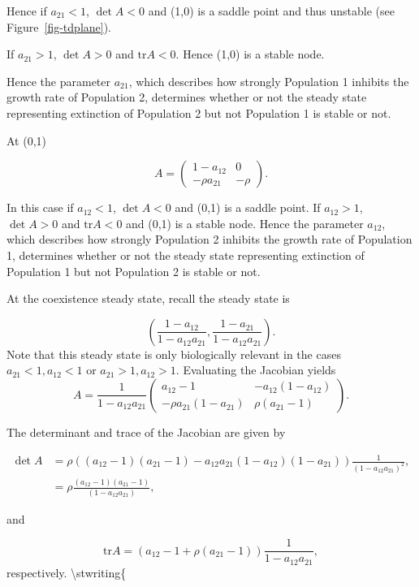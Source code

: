 \documentclass[
  letterpaper,
  DIV=11,
  numbers=noendperiod]{scrreprt}
\begin{document}
Hence if \(a_{21}<1\), \(\det{A}<0\) and (1,0) is a saddle point and
thus unstable (see Figure~\ref{fig-tdplane}).

If \(a_{21}>1\), \(\det{A}>0\) and \(\mathrm{tr}{A}<0\). Hence (1,0) is
a stable node.

Hence the parameter \(a_{21}\), which describes how strongly Population
1 inhibits the growth rate of Population 2, determines whether or not
the steady state representing extinction of Population 2 but not
Population 1 is stable or not.

At (0,1)

\[
A=\left(\begin{array}{rr}
1-a_{12}& 0\\  -\rho a_{21} & -\rho \end{array}\right). 
\]

In this case if \(a_{12}<1\), \(\det{A}<0\) and (0,1) is a saddle point.
If \(a_{12}>1\), \(\det{A}>0\) and \(\mathrm{tr}{A}<0\) and (0,1) is a
stable node. Hence the parameter \(a_{12}\), which describes how
strongly Population 2 inhibits the growth rate of Population 1,
determines whether or not the steady state representing extinction of
Population 1 but not Population 2 is stable or not.

At the coexistence steady state, recall the steady state is

\[
\left(\frac{1-a_{12}}{1-a_{12}a_{21}},\frac{1-a_{21}}{1-a_{12}a_{21}}\right).
\] Note that this steady state is only biologically relevant in the
cases \(a_{21}<1, a_{12}<1\) or \(a_{21}>1, a_{12}>1\). Evaluating the
Jacobian yields \[
A=\frac{1}{1-a_{12}a_{21}}\left(\begin{array}{rr}
a_{12}-1  & -a_{12}(1-a_{12})\\ -\rho a_{21}(1-a_{21}) &\rho(a_{21}-1)\end{array}\right). 
\]

The determinant and trace of the Jacobian are given by

\[
\begin{aligned}
\det{A}&=\rho\left((a_{12}-1)(a_{21}-1)-a_{12}a_{21}(1-a_{12})(1-a_{21})\right)\frac{1}{(1-a_{12}a_{21})^2}, \nonumber \\
&= \rho\frac{(a_{12}-1)(a_{21}-1)}{(1-a_{12}a_{21})},
\end{aligned}
\]

and

\[
\mathrm{tr}{A}=\left(a_{12}-1+\rho(a_{21}-1)\right) \frac{1}{1-a_{12}a_{21}},
\] respectively. \textbackslash stwriting\{
\end{document}
